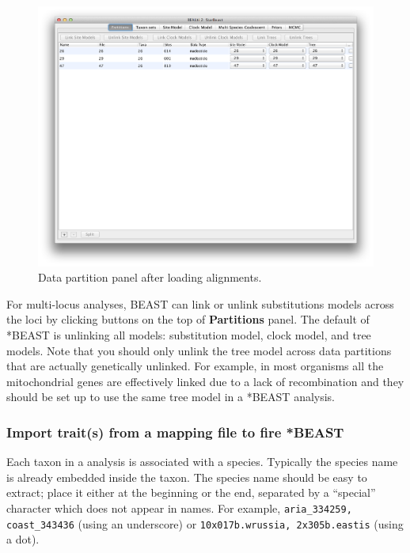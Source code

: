 \documentclass{article}
\begin{document}
\begin{figure}
\begin{center}

\includegraphics[scale=0.4,clip=true,trim=0 300 0 0]{figures/BEAUti_DataPartitions}

\end{center}
\caption{\label{fig.datapartition} Data partition panel after loading alignments.}
\end{figure}


For multi-locus analyses, BEAST can link or unlink substitutions models across the loci by clicking buttons on the top of {\bf Partitions} panel. The default of *BEAST is unlinking all models: substitution model, clock model, and tree models. Note that you should only unlink the tree model across data partitions that are actually genetically unlinked. For example, in most organisms all the mitochondrial genes are effectively linked due to a lack of recombination and they should be set up to use the same tree model in a *BEAST analysis. 

\subsubsection*{Import trait(s) from a mapping file to fire *BEAST}

Each taxon in a \mlstname{} analysis is associated with a species. Typically the
species name is already embedded inside the taxon. The species name should be
easy to extract; place it either at the beginning or the end, separated by a
``special'' character which does not appear in names. For example,
\texttt{aria\_334259, coast\_343436} (using an underscore) or
\texttt{10x017b.wrussia, 2x305b.eastis} (using a dot).
\end{document}
